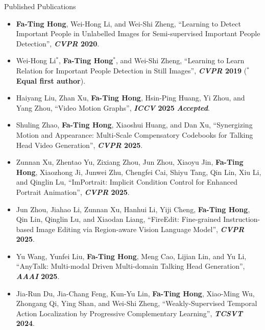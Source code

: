 \documentclass{resume} %
\begin{document}
\begin{rSection}{Published Publications}
\begin{itemize}[leftmargin=10pt]
    \item \textbf{Fa-Ting Hong}, Wei-Hong Li, and Wei-Shi Zheng, ``Learning to Detect Important People in Unlabelled Images for Semi-supervised Important People Detection'', \textbf{\textit{CVPR} 2020}.
    \vspace{-5pt}

    \item Wei-Hong Li$^*$, \textbf{Fa-Ting Hong}$^*$, and Wei-Shi Zheng, ``Learning to Learn Relation for Important People Detection in Still Images'', \textbf{\textit{CVPR} 2019} (\textbf{${^*}$Equal first author}).
    \vspace{-5pt}

    \item Haiyang Liu, Zhan Xu, \textbf{Fa-Ting Hong}, Hsin-Ping Huang, Yi Zhou, and Yang Zhou, ``Video Motion Graphs'', \textbf{\textit{ICCV} 2025} \textbf{\textit{Accepted}}.
    \vspace{-5pt}

    \item Shuling Zhao, \textbf{Fa-Ting Hong}, Xiaoshui Huang, and Dan Xu, ``Synergizing Motion and Appearance: Multi-Scale Compensatory Codebooks for Talking Head Video Generation'', \textbf{\textit{CVPR} 2025}.
    \vspace{-5pt}

    \item Zunnan Xu, Zhentao Yu, Zixiang Zhou, Jun Zhou, Xiaoyu Jin, \textbf{Fa-Ting Hong}, Xiaozhong Ji, Junwei Zhu, Chengfei Cai, Shiyu Tang, Qin Lin, Xiu Li, and Qinglin Lu, ``ImPortrait: Implicit Condition Control for Enhanced Portrait Animation'', \textbf{\textit{CVPR} 2025}.
    \vspace{-5pt}

    \item Jun Zhou, Jiahao Li, Zunnan Xu, Hanhui Li, Yiji Cheng, \textbf{Fa-Ting Hong}, Qin Lin, Qinglin Lu, and Xiaodan Liang, ``FireEdit: Fine-grained Instruction-based Image Editing via Region-aware Vision Language Model'', \textbf{\textit{CVPR} 2025}.
    \vspace{-5pt}

    \item Yu Wang, Yunfei Liu, \textbf{Fa-Ting Hong}, Meng Cao, Lijian Lin, and Yu Li, ``AnyTalk: Multi-modal Driven Multi-domain Talking Head Generation'', \textbf{\textit{AAAI} 2025}.
    \vspace{-5pt}

    \item Jia-Run Du, Jia-Chang Feng, Kun-Yu Lin, \textbf{Fa-Ting Hong}, Xiao-Ming Wu, Zhongang Qi, Ying Shan, and Wei-Shi Zheng, ``Weakly-Supervised Temporal Action Localization by Progressive Complementary Learning'', \textbf{\textit{TCSVT} 2024}.
    \vspace{-5pt}


\end{itemize}
\end{rSection}
\end{document}
